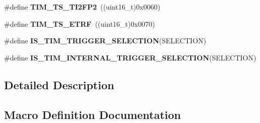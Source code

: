 \begin{DoxyCompactItemize}
\item 
\#define {\bfseries T\+I\+M\+\_\+\+T\+S\+\_\+\+T\+I2\+F\+P2}~((uint16\+\_\+t)0x0060)\hypertarget{group___t_i_m___internal___trigger___selection_ga0ed58a269bccd3f22d19cc9a2ba3123f}{}\label{group___t_i_m___internal___trigger___selection_ga0ed58a269bccd3f22d19cc9a2ba3123f}

\item 
\#define {\bfseries T\+I\+M\+\_\+\+T\+S\+\_\+\+E\+T\+RF}~((uint16\+\_\+t)0x0070)\hypertarget{group___t_i_m___internal___trigger___selection_gaece08e02e056613a882aa7ff0a6ccc2d}{}\label{group___t_i_m___internal___trigger___selection_gaece08e02e056613a882aa7ff0a6ccc2d}

\item 
\#define {\bfseries I\+S\+\_\+\+T\+I\+M\+\_\+\+T\+R\+I\+G\+G\+E\+R\+\_\+\+S\+E\+L\+E\+C\+T\+I\+ON}(S\+E\+L\+E\+C\+T\+I\+ON)
\item 
\#define {\bfseries I\+S\+\_\+\+T\+I\+M\+\_\+\+I\+N\+T\+E\+R\+N\+A\+L\+\_\+\+T\+R\+I\+G\+G\+E\+R\+\_\+\+S\+E\+L\+E\+C\+T\+I\+ON}(S\+E\+L\+E\+C\+T\+I\+ON)
\end{DoxyCompactItemize}


\subsection{Detailed Description}


\subsection{Macro Definition Documentation}
